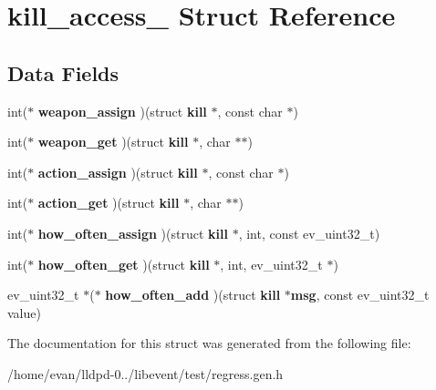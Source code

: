 \section{kill\-\_\-access\-\_\- \-Struct \-Reference}
\label{structkill__access__}
\subsection*{\-Data \-Fields}
\begin{DoxyCompactItemize}
\item 
int($\ast$ {\bfseries weapon\-\_\-assign} )(struct {\bf kill} $\ast$, const char $\ast$)\label{structkill__access___a759c08c25279ad21f5574ab3f576c343}

\item 
int($\ast$ {\bfseries weapon\-\_\-get} )(struct {\bf kill} $\ast$, char $\ast$$\ast$)\label{structkill__access___abde72c69b35f109f25217bfce2401da0}

\item 
int($\ast$ {\bfseries action\-\_\-assign} )(struct {\bf kill} $\ast$, const char $\ast$)\label{structkill__access___a98ceded2fa31541eaf44ca07931122ee}

\item 
int($\ast$ {\bfseries action\-\_\-get} )(struct {\bf kill} $\ast$, char $\ast$$\ast$)\label{structkill__access___a3cc96dc0460b2b028f8b3ac91dee521c}

\item 
int($\ast$ {\bfseries how\-\_\-often\-\_\-assign} )(struct {\bf kill} $\ast$, int, const ev\-\_\-uint32\-\_\-t)\label{structkill__access___afdce4bf82f5a323abd4dda94f4f883b3}

\item 
int($\ast$ {\bfseries how\-\_\-often\-\_\-get} )(struct {\bf kill} $\ast$, int, ev\-\_\-uint32\-\_\-t $\ast$)\label{structkill__access___a7be195eaf18a06737c1c9e17b41b78b2}

\item 
ev\-\_\-uint32\-\_\-t $\ast$($\ast$ {\bfseries how\-\_\-often\-\_\-add} )(struct {\bf kill} $\ast${\bf msg}, const ev\-\_\-uint32\-\_\-t value)\label{structkill__access___a9e5239b2681ee05aa4d959820aee30cb}

\end{DoxyCompactItemize}


\-The documentation for this struct was generated from the following file\-:\begin{DoxyCompactItemize}
\item 
/home/evan/lldpd-\/0../libevent/test/regress.\-gen.\-h\end{DoxyCompactItemize}
